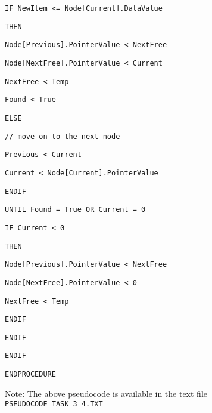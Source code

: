 {\begin{minipage}[t]{1\columnwidth - 2\fboxsep - 2\fboxrule}
\texttt{\qquad{}\qquad{}\qquad{}\qquad{}\qquad{}IF NewItem <=
Node{[}Current{]}.DataValue }

\texttt{\qquad{}\qquad{}\qquad{}\qquad{}\qquad{}\qquad{}THEN }

\texttt{\qquad{}\qquad{}\qquad{}\qquad{}\qquad{}\qquad{}\qquad{}Node{[}Previous{]}.PointerValue
<\textemdash{} NextFree }

\texttt{\qquad{}\qquad{}\qquad{}\qquad{}\qquad{}\qquad{}\qquad{}Node{[}NextFree{]}.PointerValue
<\textemdash{} Current }

\texttt{\qquad{}\qquad{}\qquad{}\qquad{}\qquad{}\qquad{}\qquad{}NextFree
<\textemdash{} Temp }

\texttt{\qquad{}\qquad{}\qquad{}\qquad{}\qquad{}\qquad{}\qquad{}Found
<\textemdash{} True }

\texttt{\qquad{}\qquad{}\qquad{}\qquad{}\qquad{}\qquad{}ELSE }

\texttt{\qquad{}\qquad{}\qquad{}\qquad{}\qquad{}\qquad{}\qquad{}//
move on to the next node }

\texttt{\qquad{}\qquad{}\qquad{}\qquad{}\qquad{}\qquad{}\qquad{}Previous
<\textemdash{} Current }

\texttt{\qquad{}\qquad{}\qquad{}\qquad{}\qquad{}\qquad{}\qquad{}Current
<\textemdash{} Node{[}Current{]}.PointerValue }

\texttt{\qquad{}\qquad{}\qquad{}\qquad{}\qquad{}ENDIF }

\texttt{\qquad{}\qquad{}\qquad{}\qquad{}UNTIL Found = True OR
Current = 0 }

\texttt{\qquad{}\qquad{}\qquad{}\qquad{}IF Current <\textemdash{}
0 }

\texttt{\qquad{}\qquad{}\qquad{}\qquad{}\qquad{}THEN }

\texttt{\qquad{}\qquad{}\qquad{}\qquad{}\qquad{}\qquad{}Node{[}Previous{]}.PointerValue
<\textemdash{} NextFree }

\texttt{\qquad{}\qquad{}\qquad{}\qquad{}\qquad{}\qquad{}Node{[}NextFree{]}.PointerValue
<\textemdash{} 0 }

\texttt{\qquad{}\qquad{}\qquad{}\qquad{}\qquad{}\qquad{}NextFree
<\textemdash{} Temp }

\texttt{\qquad{}\qquad{}\qquad{}\qquad{}ENDIF }

\texttt{\qquad{}\qquad{}ENDIF }

\texttt{\qquad{}ENDIF }

\texttt{ENDPROCEDURE }

Note: The above pseudocode is available in the text file \texttt{PSEUDOCODE\_TASK\_3\_4.TXT}%
\end{minipage}}

